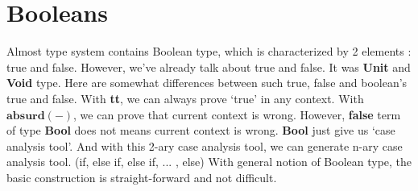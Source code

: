 \documentclass[12pt, a4paper, openany, twoside]{book}
\theoremstyle{definition}
\theoremstyle{remark}
\theoremstyle{plain}
\numberwithin{equation}{section}
\begin{document}
\newpage 

\section{Booleans}

Almost type system contains Boolean type, which is characterized by 2 elements : true and false. 
However, we've already talk about true and false. It was \textbf{Unit} and \textbf{Void} type. 
Here are somewhat differences between such true, false and boolean's true and false. 
With \textbf{tt}, we can always prove \lq true' in any context. With $\mathbf{absurd}(-)$, 
we can prove that current context is wrong. However, \textbf{false} term of type \textbf{Bool} does not means 
current context is wrong. \textbf{Bool} just give us \lq case analysis tool'. 
And with this 2-ary case analysis tool, we can generate n-ary case analysis tool. 
(if, else if, else if, ... , else) With general notion of Boolean type, the basic construction is straight-forward and not difficult. 

\begin{tcolorbox}[colback=yellow!10!white,colframe=green!75!black,title=Construction 3.3.1.]\hypertarget{const 3.3.1.}{}
\end{tcolorbox}

\begin{tcolorbox}[colback=yellow!10!white,colframe=green!75!black,title=Construction 3.3.2.]\hypertarget{const 3.3.2.}{}
\end{tcolorbox}
\end{document}
